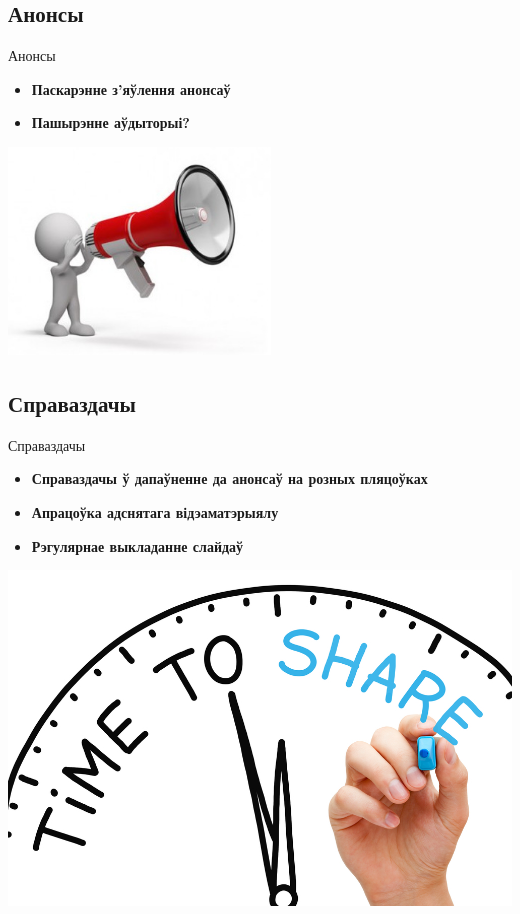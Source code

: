 \documentclass[ignorenonframetext,hyperref={pdftex,unicode}]{beamer}
\begin{document}
\subsection{Анонсы}
\begin{frame}{Анонсы}
	\begin{itemize}
		\item \textbf{Паскарэнне з'яўлення анонсаў}
		\item \textbf{Пашырэнне аўдыторыі?}
	\end{itemize}
	\begin{center}
		\includegraphics[height=156pt]{survey-announce}
	\end{center}
\end{frame}

\subsection{Справаздачы}
\begin{frame}{Справаздачы}
	\begin{itemize}
		\item \textbf{Справаздачы ў дапаўненне да анонсаў на розных пляцоўках}
		\item \textbf{Апрацоўка адснятага відэаматэрыялу}
		\item \textbf{Рэгулярнае выкладанне слайдаў}
	\end{itemize}
	\begin{center}
		\includegraphics{Time-to-Share}
	\end{center}
\end{frame}
\end{document}
